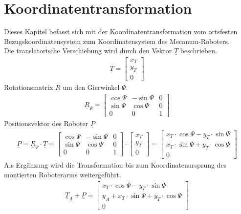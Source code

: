 \documentclass[a4paper]{article}
\begin{document}
\section{Koordinatentransformation}
Dieses Kapitel befasst sich mit der Koordinatentransformation vom ortsfesten Bezugskoordinatensystem zum Koordinatensystem des Mecanum-Roboters. \\
Die translatorische Verschiebung wird durch den Vektor $\underline T$ beschrieben.
\begin{align*}
\underline T = 
\begin{bmatrix}
x_{T}\\
y_{T}\\
0
\end{bmatrix}
\end{align*}
Rotationsmatrix $\underline R$ um den Gierwinkel $\Psi$.
\begin{align*}
 \underline R_{\Psi} =
\begin{bmatrix}
  \cos{\Psi} & -\sin{\Psi} & 0\\
  \sin{\Psi} & \cos{\Psi} & 0\\
  0 & 0 & 1
\end{bmatrix}
\end{align*} 
Positionsvektor des Roboter $\underline P$
\begin{align*}
\underline P = \underline R_{\Psi} \cdot \underline T =
\begin{bmatrix}
  \cos{\Psi} & -\sin{\Psi} & 0\\
  \sin{\Psi} & \cos{\Psi} & 0\\
  0 & 0 & 1
\end{bmatrix}\cdot
\begin{bmatrix}
x_{T}\\
y_{T}\\
0
\end{bmatrix}=
\begin{bmatrix}
x_{T} \cdot \cos{\Psi}-y_{T} \cdot \sin{\Psi}\\
x_{T} \cdot \sin{\Psi}+y_{T}  \cdot \cos{\Psi}\\
0
\end{bmatrix}
\end{align*}
Als Ergänzung wird die Transformation bis zum Koordinatenursprung des montierten Roboterarms weitergeführt.
\begin{align*}
\underline T_{A} + \underline P =
\begin{bmatrix}
x_{T} \cdot \cos{\Psi}-y_{T} \cdot \sin{\Psi}\\
y_{A} + x_{T} \cdot \sin{\Psi}+y_{T}  \cdot \cos{\Psi}\\
0
\end{bmatrix}
\end{align*}
\end{document}
